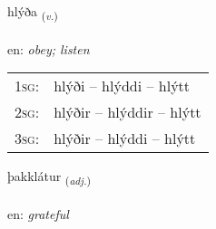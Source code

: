 \documentclass[frontgrid, backgrid]{flacards}\usepackage[]{graphicx}\usepackage[]{xcolor}
\begin{document}
\renewcommand{\flhead}{\vskip5pt \fboxsep=0pt {\small\bfseries\footnotesize Sagnorð | Verb}}
\renewcommand{\fcfoot}{\vskip5pt \fboxsep=0pt \hspace{2pt}{\small\bfseries\footnotesize 3K}}

\renewcommand{\blhead}{\vskip5pt {\small\bfseries\footnotesize Sagnorð | Verb }}
\renewcommand{\bcfoot}{\vskip5pt \hspace{2pt}{\small\bfseries\footnotesize 3K}}


{hlýða \small{\textsubscript{(\textit{v.})}} \\[1ex] %
\textphonetic{[l̥iːða]} \\
en: \emph{obey; listen} \\  [2ex]
\renewcommand*{\arraystretch}{0.8}
\begin{tabular}{p{1cm}l}
\textsc{1sg}: & hlýði -- hlýddi -- hlýtt \\ 
\textsc{2sg}: & hlýðir -- hlýddir -- hlýtt \\ 
\textsc{3sg}: & hlýðir -- hlýddi -- hlýtt \\ 
\end{tabular}
}

\renewcommand{\flhead}{\vskip5pt \fboxsep=0pt {\small\bfseries\footnotesize Lýsingarorð | Adjective}}
\renewcommand{\fcfoot}{\vskip5pt \fboxsep=0pt \hspace{2pt}{\small\bfseries\footnotesize 3K}}

\renewcommand{\blhead}{\vskip5pt {\small\bfseries\footnotesize Lýsingarorð | Adjective }}
\renewcommand{\bcfoot}{\vskip5pt \hspace{2pt}{\small\bfseries\footnotesize 3K}}


{þakklátur \small{\textsubscript{(\textit{adj.})}} \\[1ex] %
\textphonetic{[θahklautʏr]} \\
en: \emph{grateful} \\  [2ex]
\renewcommand*{\arraystretch}{0.8}
}
\end{document}
